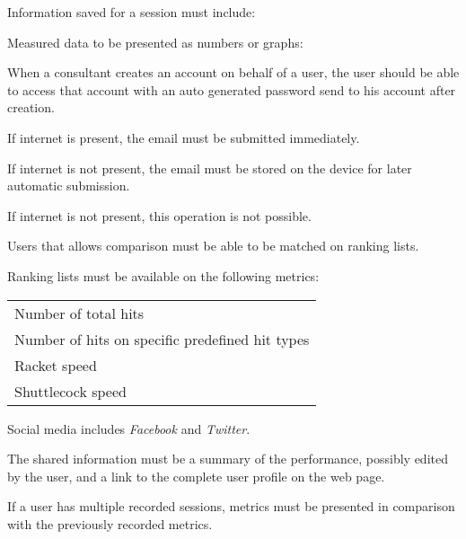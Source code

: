 Information saved for a session must include: \newline
{}


Measured data to be presented as numbers or graphs: \newline
{}


When a consultant creates an account on behalf of a user, the user should be able to access that account with an auto generated password send to his account after creation.

If internet is present, the email must be submitted immediately.

If internet is not present, the email must be stored on the device for later automatic submission.


If internet is not present, this operation is not possible.


Users that allows comparison must be able to be matched on ranking lists.

Ranking lists must be available on the following metrics: \newline
\begin{tabularx}{\textwidth}{X}
    Number of total hits \\
    Number of hits on specific predefined hit types \\
    Racket speed \\
    Shuttlecock speed \\
\end{tabularx}


Social media includes \textit{Facebook} and \textit{Twitter}.

The shared information must be a summary of the performance, possibly edited by the user, and a link to the complete user profile on the web page.


If a user has multiple recorded sessions, metrics must be presented in comparison with the previously recorded metrics.
